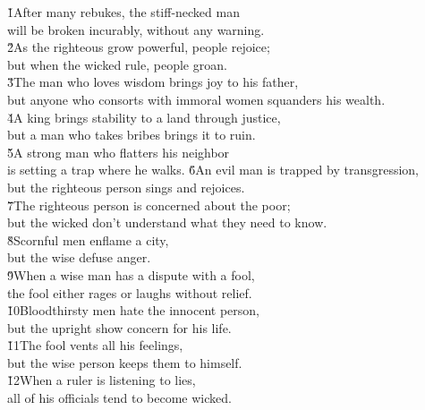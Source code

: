 \begin{poetry}
\poeml {}
\v{1}After many rebukes, the stiff-necked man \\
\poeml will be broken incurably, without any warning. \\
\poeml \v{2}As the righteous grow powerful, people rejoice; \\
\poemll    but when the wicked rule, people groan. \\
\poeml \v{3}The man who loves wisdom brings joy to his father, \\
\poemll    but anyone who consorts with immoral women squanders his wealth. \\
\poeml \v{4}A king brings stability to a land through justice, \\
\poemll    but a man who takes bribes brings it to ruin. \\
\poeml \v{5}A strong man who flatters his neighbor \\
\poemll    is setting a trap where he walks.
\poeml \v{6}An evil man is trapped by transgression, \\
\poemll    but the righteous person sings and rejoices. \\
\poeml \v{7}The righteous person is concerned about the poor; \\
\poemll    but the wicked don't understand what they need to know. \\
\poeml \v{8}Scornful men enflame a city, \\
\poemll    but the wise defuse anger. \\
\poeml \v{9}When a wise man has a dispute with a fool, \\
\poemll    the fool either rages or laughs without relief. \\
\poeml \v{10}Bloodthirsty men hate the innocent person, \\
\poemll    but the upright show concern for his life. \\
\poeml \v{11}The fool vents all his feelings, \\
\poemll    but the wise person keeps them to himself. \\
\poeml \v{12}When a ruler is listening to lies, \\
\poemll    all of his officials tend to become wicked. \\

\end{poetry}
